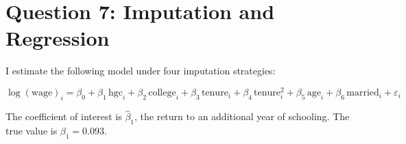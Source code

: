 \documentclass[12pt]{article}
\begin{document}
\section*{Question 7: Imputation and Regression}

I estimate the following model under four imputation strategies:

\begin{equation}
\log(\text{wage})_i = \beta_0 + \beta_1\,\text{hgc}_i + \beta_2\,\text{college}_i + \beta_3\,\text{tenure}_i + \beta_4\,\text{tenure}^2_i + \beta_5\,\text{age}_i + \beta_6\,\text{married}_i + \varepsilon_i
\end{equation}

The coefficient of interest is $\hat{\beta}_1$, the return to an additional year of schooling. The true value is $\beta_1 = 0.093$.
\end{document}

